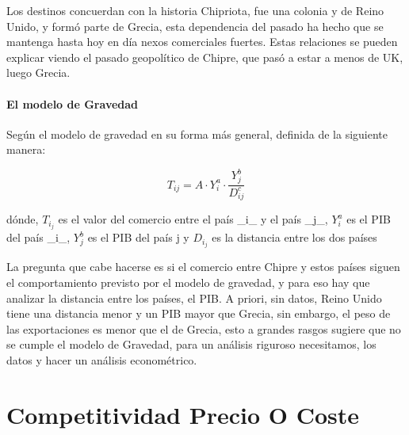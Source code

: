 \documentclass[a4paper,openright,12pt]{book}
\begin{document}
Los destinos concuerdan con la historia Chipriota, fue una colonia y de Reino Unido, y formó parte de Grecia, esta dependencia del pasado ha hecho que se mantenga hasta hoy en día nexos comerciales fuertes. Estas relaciones se pueden explicar viendo el pasado geopolítico de Chipre, que pasó a estar a menos de UK, luego Grecia.

\subsubsection{El modelo de Gravedad}

Según el modelo de gravedad en su forma más general, definida de la siguiente manera:

\begin{equation}
T_{ij} = A \cdot Y_i^a \cdot \frac{Y_j^b}{D_{ij}^c}
\end{equation}

dónde, $T_i_j$ es el valor del comercio entre el país _i_ y el país _j_, $Y_i^a$ es el PIB del país _i_, $Y_j^b$ es el PIB del país j y $D_i_j$ es la distancia entre los dos países

La pregunta que cabe hacerse es si el comercio entre Chipre y estos países siguen el comportamiento previsto por el modelo de gravedad, y para eso hay que analizar la distancia entre los países, el PIB. A priori, sin datos, Reino Unido tiene una distancia menor y un PIB mayor que Grecia, sin embargo, el peso de las exportaciones es menor que el de Grecia, esto a grandes rasgos sugiere que no se cumple el modelo de Gravedad, para un análisis riguroso necesitamos, los datos y hacer un análisis econométrico.

\chapter{Competitividad Precio O Coste}
\label{cap4}
\end{document}
